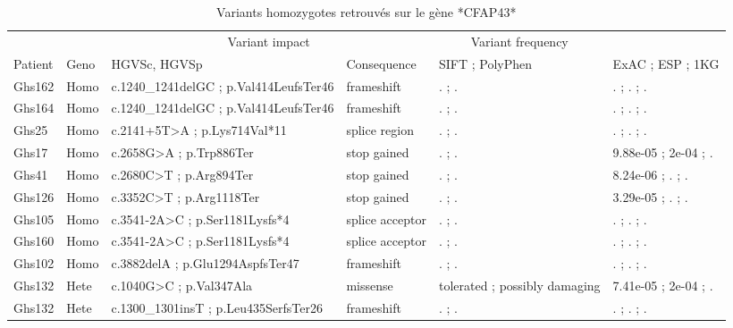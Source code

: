 \documentclass[12pt,twoside]{ugathesis}
\begin{document}
\begin{landscape}
\begin{longtable}[t]{llllll}
\caption{\label{tab:tabcfap43}Variants homozygotes retrouvés sur le gène *CFAP43*}\\
\toprule
\multicolumn{2}{c}{ } & \multicolumn{2}{c}{Variant impact} & \multicolumn{1}{c}{Variant frequency} \\
\cmidrule(l{2pt}r{2pt}){3-4} \cmidrule(l{2pt}r{2pt}){5-5}
Patient & Geno & HGVSc, HGVSp & Consequence & SIFT ; PolyPhen & ExAC ; ESP ; 1KG\\
\midrule
Ghs162 & Homo & c.1240\_1241delGC ; p.Val414LeufsTer46 & frameshift & . ; . & . ; . ; .\\
Ghs164 & Homo & c.1240\_1241delGC ; p.Val414LeufsTer46 & frameshift & . ; . & . ; . ; .\\
Ghs25 & Homo & c.2141+5T>A ; p.Lys714Val*11 & splice region & . ; . & . ; . ; .\\
Ghs17 & Homo & c.2658G>A ; p.Trp886Ter & stop gained & . ; . & 9.88e-05 ; 2e-04 ; .\\
Ghs41 & Homo & c.2680C>T ; p.Arg894Ter & stop gained & . ; . & 8.24e-06 ; . ; .\\
\addlinespace
Ghs126 & Homo & c.3352C>T ; p.Arg1118Ter & stop gained & . ; . & 3.29e-05 ; . ; .\\
Ghs105 & Homo & c.3541-2A>C ; p.Ser1181Lysfs*4 & splice acceptor & . ; . & . ; . ; .\\
Ghs160 & Homo & c.3541-2A>C ; p.Ser1181Lysfs*4 & splice acceptor & . ; . & . ; . ; .\\
Ghs102 & Homo & c.3882delA ; p.Glu1294AspfsTer47 & frameshift & . ; . & . ; . ; .\\
Ghs132 & Hete & c.1040G>C ; p.Val347Ala & missense & tolerated ; possibly damaging & 7.41e-05 ; 2e-04 ; .\\
Ghs132 & Hete & c.1300\_1301insT ; p.Leu435SerfsTer26 & frameshift & . ; . & . ; . ; .\\
\bottomrule
\end{longtable}
\end{landscape}

\newpage
\end{document}
